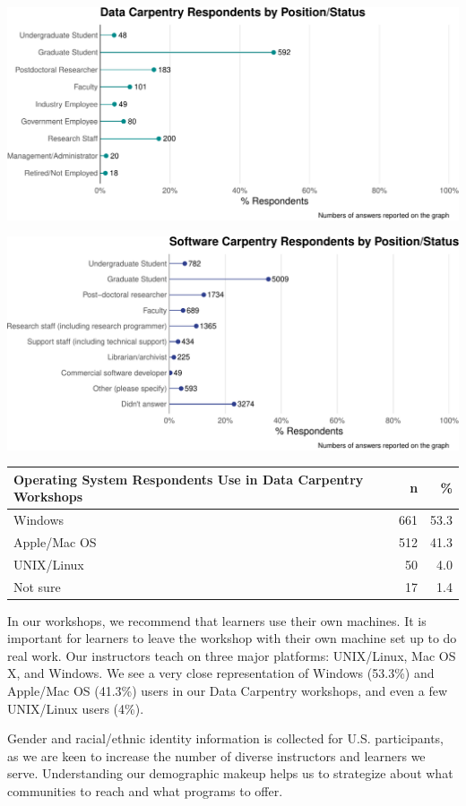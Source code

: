 \documentclass[]{article}
\begin{document}
\includegraphics[width=720]{figures/dc-status-plot-1}

\includegraphics[width=720]{figures/swc-status-plot-1}

\begin{longtable}[]{@{}lrr@{}}
\toprule
Operating System Respondents Use in Data Carpentry Workshops & n &
\%\tabularnewline
\midrule
\endhead
Windows & 661 & 53.3\tabularnewline
Apple/Mac OS & 512 & 41.3\tabularnewline
UNIX/Linux & 50 & 4.0\tabularnewline
Not sure & 17 & 1.4\tabularnewline
\bottomrule
\end{longtable}

In our workshops, we recommend that learners use their own machines. It
is important for learners to leave the workshop with their own machine
set up to do real work. Our instructors teach on three major platforms:
UNIX/Linux, Mac OS X, and Windows. We see a very close representation of
Windows (53.3\%) and Apple/Mac OS (41.3\%) users in our Data Carpentry
workshops, and even a few UNIX/Linux users (4\%).

Gender and racial/ethnic identity information is collected for U.S.
participants, as we are keen to increase the number of diverse
instructors and learners we serve. Understanding our demographic makeup
helps us to strategize about what communities to reach and what programs
to offer.
\end{document}
